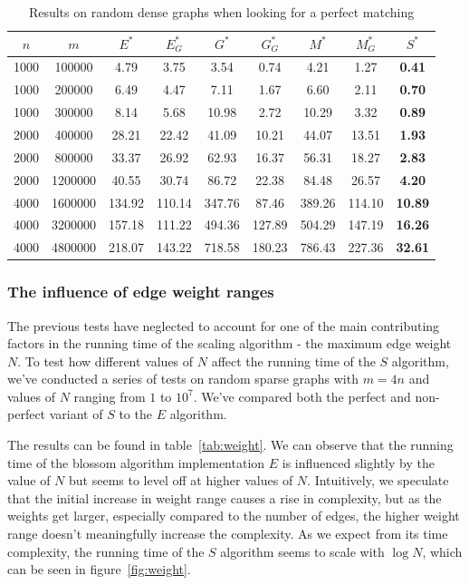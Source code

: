 \begin{table}
\centering
{} {
\begin{tabular}{
cc|ccccccc}
$n$ & $m$ & $E^*$ & $E^*_G$ & $G^*$ & $G^*_G$ & $M^*$ & $M^*_G$ & $S^*$ \\
\hline
1000 & 100000 & 4.79 & 3.75 & 3.54 & 0.74 & 4.21 & 1.27 & \textbf{0.41} \\
1000 & 200000 & 6.49 & 4.47 & 7.11 & 1.67 & 6.60 & 2.11 & \textbf{0.70} \\
1000 & 300000 & 8.14 & 5.68 & 10.98 & 2.72 & 10.29 & 3.32 & \textbf{0.89} \\
2000 & 400000 & 28.21 & 22.42 & 41.09 & 10.21 & 44.07 & 13.51 & \textbf{1.93} \\
2000 & 800000 & 33.37 & 26.92 & 62.93 & 16.37 & 56.31 & 18.27 & \textbf{2.83} \\
2000 & 1200000 & 40.55 & 30.74 & 86.72 & 22.38 & 84.48 & 26.57 & \textbf{4.20} \\
4000 & 1600000 & 134.92 & 110.14 & 347.76 & 87.46 & 389.26 & 114.10 & \textbf{10.89} \\
4000 & 3200000 & 157.18 & 111.22 & 494.36 & 127.89 & 504.29 & 147.19 & \textbf{16.26} \\
4000 & 4800000 & 218.07 & 143.22 & 718.58 & 180.23 & 786.43 & 227.36 & \textbf{32.61} \\
\end{tabular}
}
\caption{Results on random dense graphs when looking for a perfect matching}\label{tab:perfect_dense}
\end{table}

\subsubsection*{The influence of edge weight ranges}

The previous tests have neglected to account for one of the main contributing factors in the running time of the scaling algorithm - the maximum edge weight $N$. To test how different values of $N$ affect the running time of the $S$ algorithm, we've conducted a series of tests on random sparse graphs with $m = 4n$ and values of $N$ ranging from $1$ to $10^7$. We've compared both the perfect and non-perfect variant of $S$ to the $E$ algorithm. 

The results can be found in table~\ref{tab:weight}. We can observe that the running time of the blossom algorithm implementation $E$ is influenced slightly by the value of $N$ but seems to level off at higher values of $N$. Intuitively, we speculate that the initial increase in weight range causes a rise in complexity, but as the weights get larger, especially compared to the number of edges, the higher weight range doesn't meaningfully increase the complexity. As we expect from its time complexity, the running time of the $S$ algorithm seems to scale with $\log N$, which can be seen in figure~\ref{fig:weight}.

